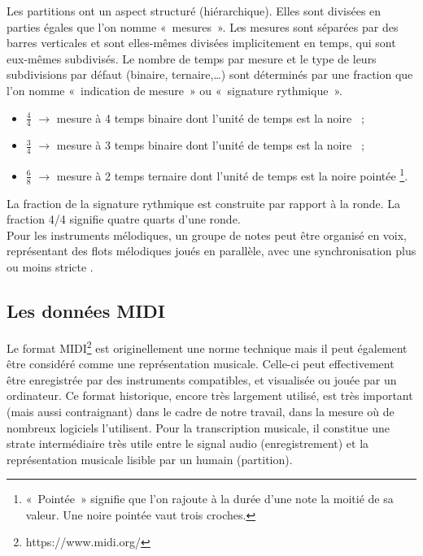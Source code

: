Les partitions ont un aspect structuré (hiérarchique). Elles sont divisées en
parties égales que l’on nomme «~mesures~». Les mesures sont séparées par des
barres verticales et sont elles-mêmes divisées implicitement en temps, qui sont
eux-mêmes subdivisés. Le nombre de temps par mesure et le type de leurs
subdivisions par défaut (binaire, ternaire,…) sont déterminés par une fraction
que l’on nomme «~indication de mesure~» ou «~signature rythmique~».\\

\begin{itemize}
    \item $\frac{4}{4}$ $\to$ mesure à 4 temps binaire dont l’unité de temps
        est la noire~ ;\\
    \item $\frac{3}{4}$ $\to$ mesure à 3 temps binaire dont l’unité de temps
        est la noire~ ;\\
    \item $\frac{6}{8}$ $\to$ mesure à 2 temps ternaire dont l’unité de temps
        est la noire pointée \footnote{«~Pointée~» signifie que l’on rajoute à
        la durée d’une note la moitié de sa valeur. Une noire pointée vaut
    trois croches.}.\\
\end{itemize}

La fraction de la signature rythmique est construite par rapport à la ronde.
La fraction 4/4 signifie quatre quarts d’une ronde.\\

Pour les instruments mélodiques, un groupe de notes peut être organisé en
voix, représentant des flots mélodiques joués en parallèle, avec une
synchronisation plus ou moins stricte \cite{shibata} \cite{
Guiomard-Kagan}.

\subsection*{Les données MIDI}
Le format MIDI\footnote{https://www.midi.org/} est originellement une norme
technique mais il peut également être considéré comme une représentation
musicale. Celle-ci peut effectivement être enregistrée par des instruments
compatibles, et visualisée ou jouée par un ordinateur. Ce format historique,
encore très largement utilisé, est très important (mais aussi contraignant)
dans le cadre de notre travail, dans la mesure où de nombreux logiciels
l’utilisent. Pour la transcription musicale, il constitue une strate
intermédiaire très utile entre le signal audio (enregistrement) et la
représentation musicale lisible par un humain (partition).

